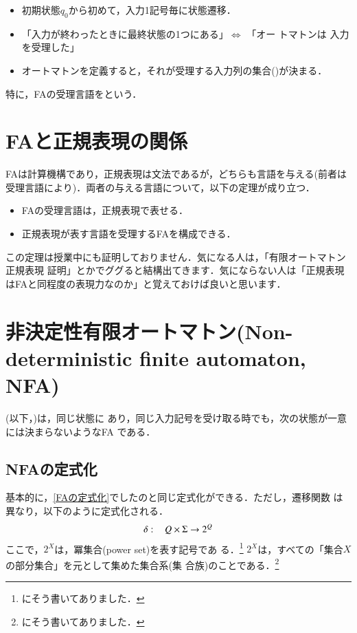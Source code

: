 \begin{itemize}
 \item 初期状態$q_0$から初めて，入力1記号毎に状態遷移．
 \item 「入力が終わったときに最終状態の1つにある」$\Leftrightarrow$ 「オー
       トマトンは
       入力を受理した」
 \item オートマトンを定義すると，それが受理する入力列の集合()が決まる．
\end{itemize}

特に，FAの受理言語をという．

\section{FAと正規表現の関係}
FAは計算機構であり，正規表現は文法であるが，どちらも言語を与える(前者は
受理言語により)．両者の与える言語について，以下の定理が成り立つ．

\begin{itemize}
 \item FAの受理言語は，正規表現で表せる．
 \item 正規表現が表す言語を受理するFAを構成できる．
\end{itemize}

この定理は授業中にも証明しておりません．気になる人は，「有限オートマトン
正規表現 証明」とかでググると結構出てきます．気にならない人は「正規表現
はFAと同程度の表現力なのか」と覚えておけば良いと思います．

\section{非決定性有限オートマトン(Non-deterministic finite automaton, NFA)}
(以下，)は，同じ状態に
あり，同じ入力記号を受け取る時でも，次の状態が一意には決まらないようなFA
である．

\subsection{NFAの定式化}
基本的に，\ref{FAの定式化}でしたのと同じ定式化ができる．ただし，遷移関数
は異なり，以下のように定式化される．
\begin{equation}
 \delta : \hspace{2ex} Q \times \Sigma \rightarrow 2^Q
  \label{eq:NFA_transition_function}
\end{equation}
ここで，$2^X$は，冪集合(power set)を表す記号であ
る．\footnote{\cite{power_set}にそう書いてありました．}
$2^X$は，すべての「集合$X$の部分集合」を元として集めた集合系(集
合族)のことである．\footnote{\cite{power_set}にそう書いてありました．}

